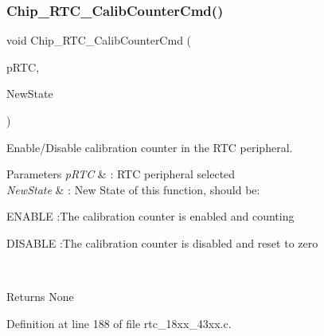 \subsubsection{\texorpdfstring{Chip\+\_\+\+R\+T\+C\+\_\+\+Calib\+Counter\+Cmd()}{Chip\_RTC\_CalibCounterCmd()}}
{\footnotesize\ttfamily void Chip\+\_\+\+R\+T\+C\+\_\+\+Calib\+Counter\+Cmd (\begin{DoxyParamCaption}\item[{\hyperlink{struct_l_p_c___r_t_c___t}{L\+P\+C\+\_\+\+R\+T\+C\+\_\+T} $\ast$}]{p\+R\+TC,  }\item[{\hyperlink{group___l_p_c___types___public___types_gac9a7e9a35d2513ec15c3b537aaa4fba1}{Functional\+State}}]{New\+State }\end{DoxyParamCaption})}



Enable/\+Disable calibration counter in the R\+TC peripheral. 


\begin{DoxyParams}{Parameters}
{\em p\+R\+TC} & \+: R\+TC peripheral selected \\
\hline
{\em New\+State} & \+: New State of this function, should be\+:
\begin{DoxyItemize}
\item E\+N\+A\+B\+LE \+:The calibration counter is enabled and counting
\item D\+I\+S\+A\+B\+LE \+:The calibration counter is disabled and reset to zero 
\end{DoxyItemize}\\
\hline
\end{DoxyParams}
\begin{DoxyReturn}{Returns}
None 
\end{DoxyReturn}


Definition at line 188 of file rtc\+\_\+18xx\+\_\+43xx.\+c.

\mbox{\label{group___r_t_c__18_x_x__43_x_x_gaa43865e87cf61d579a4ee52a307b3e30}} 
